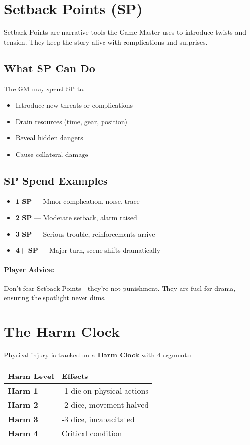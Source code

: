 \begin{multicols}{2}
\section{Setback Points (SP)} 

Setback Points are narrative tools the Game Master uses to introduce twists and tension. They keep the story alive with complications and surprises.

\subsection*{What SP Can Do}
The GM may spend SP to:
\begin{itemize}
  \item Introduce new threats or complications
  \item Drain resources (time, gear, position)
  \item Reveal hidden dangers
  \item Cause collateral damage
\end{itemize}

\subsection*{SP Spend Examples}
\begin{itemize}
  \item \textbf{1 SP} — Minor complication, noise, trace
  \item \textbf{2 SP} — Moderate setback, alarm raised
  \item \textbf{3 SP} — Serious trouble, reinforcements arrive
  \item \textbf{4+ SP} — Major turn, scene shifts dramatically
\end{itemize}

\paragraph{Player Advice:}  
Don’t fear Setback Points—they’re not punishment. They are fuel for drama, ensuring the spotlight never dims.

\section{The Harm Clock} 

Physical injury is tracked on a \textbf{Harm Clock} with 4 segments:

\begin{center}
\small
\begin{tabular}{ll}
\toprule
\textbf{Harm Level} & \textbf{Effects} \\
\midrule
\textbf{Harm 1} & -1 die on physical actions \\
\textbf{Harm 2} & -2 dice, movement halved \\
\textbf{Harm 3} & -3 dice, incapacitated \\
\textbf{Harm 4} & Critical condition \\
\bottomrule
\end{tabular}
\end{center}


\end{multicols}
